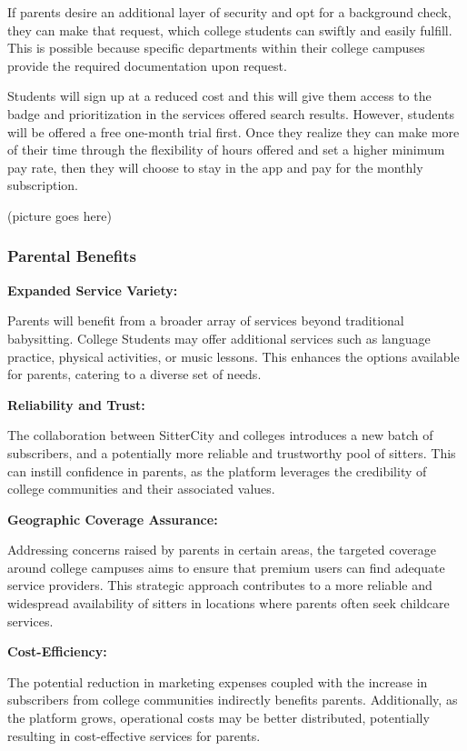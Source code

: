 \documentclass[12pt]{article}
\begin{document}
If parents desire an additional layer of security and opt for a
background check, they can make that request, which college students can
swiftly and easily fulfill. This is possible because specific
departments within their college campuses provide the required
documentation upon request.

Students will sign up at a reduced cost and this will give them access
to the badge and prioritization in the services offered search results.
However, students will be offered a free one-month trial first. Once
they realize they can make more of their time through the flexibility of
hours offered and set a higher minimum pay rate, then they will choose
to stay in the app and pay for the monthly subscription.~

(picture goes here)

\hypertarget{parental-benefits}{%
\subsubsection{\texorpdfstring{\textbf{Parental
Benefits}}{Parental Benefits}}\label{parental-benefits}}

\textbf{Expanded Service Variety:}

Parents will benefit from a broader array of services beyond traditional
babysitting. College Students may offer additional services such as
language practice, physical activities, or music lessons. This enhances
the options available for parents, catering to a diverse set of needs.

\textbf{Reliability and Trust:}

The collaboration between SitterCity and colleges introduces a new batch
of subscribers, and a potentially more reliable and trustworthy pool of
sitters. This can instill confidence in parents, as the platform
leverages the credibility of college communities and their associated
values.

\textbf{Geographic Coverage Assurance:}

Addressing concerns raised by parents in certain areas, the targeted
coverage around college campuses aims to ensure that premium users can
find adequate service providers. This strategic approach contributes to
a more reliable and widespread availability of sitters in locations
where parents often seek childcare services.

\textbf{Cost-Efficiency:}

The potential reduction in marketing expenses coupled with the increase
in subscribers from college communities indirectly benefits parents.
Additionally, as the platform grows, operational costs may be better
distributed, potentially resulting in cost-effective services for
parents.
\end{document}
